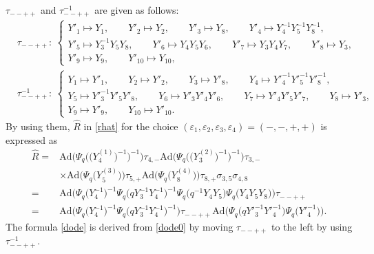 \begin{Example}\label{ex:1}
$\tau_{--++}$ and $\tau_{--++}^{-1}$ are given as follows:
\begin{align*}
&\tau_{--++}\colon\
\begin{cases}
Y'_1 \mapsto Y_1,\qquad
Y'_2 \mapsto Y_2, \qquad
Y'_3 \mapsto Y_8, \qquad
Y'_4 \mapsto Y^{-1}_4Y^{-1}_5Y^{-1}_8, \qquad
\\
Y'_5 \mapsto Y^{-1}_3Y_5Y_8, \qquad
Y'_6 \mapsto Y_4 Y_5 Y_6,\qquad
Y'_7 \mapsto Y_3Y_4Y_7,\qquad
Y'_8 \mapsto Y_3,\qquad
\\
Y'_9 \mapsto Y_9, \qquad
Y'_{10} \mapsto Y_{10},
\end{cases}
\\
&\tau_{--++}^{-1}\colon\
\begin{cases}
Y_1 \mapsto Y'_1, \qquad
Y_2 \mapsto Y'_2, \qquad
Y_3 \mapsto Y'_8, \qquad
Y_4 \mapsto Y'^{-1}_4Y'^{-1}_5Y'^{-1}_8,
\\
Y_5 \mapsto Y'^{-1}_3Y'_5Y'_8, \qquad
Y_6 \mapsto Y'_3Y'_4Y'_6, \qquad
Y_7 \mapsto Y'_4Y'_5Y'_7, \qquad
Y_8 \mapsto Y'_3,
\\
Y_9 \mapsto Y'_9, \qquad
Y_{10} \mapsto Y'_{10}.
\end{cases}
\end{align*}
By using them, $\widehat{R}$ in \eqref{rhat} for the choice
$(\varepsilon_1, \varepsilon_2, \varepsilon_3, \varepsilon_4)=(-,-,+,+)$
is expressed as
\begin{align}
\widehat{R}={}&
\mathrm{Ad}\bigl(\Psi_q\bigl(\bigl(Y^{(1)}_4\bigr)^{-1}\bigr)^{-1}\bigr)\tau_{4,-}
\mathrm{Ad}\bigl(\Psi_q\bigl(\bigl(Y^{(2)}_3\bigr)^{-1}\bigr)^{-1}\bigr)\tau_{3,-}
\nonumber \\
& \times
\mathrm{Ad}\bigl(\Psi_q\bigl(Y^{(3)}_5\bigr)\bigr)\tau_{5,+}
 \mathrm{Ad}\bigl(\Psi_q\bigl(Y^{(4)}_8\bigr)\bigr)\tau_{8,+}\sigma_{3,5}\sigma_{4,8}
\nonumber \\
={}&
\mathrm{Ad}\bigl(\Psi_q\bigl(Y_4^{-1}\bigr)^{-1}
\Psi_q\bigl(qY^{-1}_3Y^{-1}_4\bigr)^{-1}
\Psi_q\bigl(q^{-1}Y_4Y_5\bigr)
\Psi_q\bigl(Y_4Y_5Y_8\bigr)\bigr)\tau_{--++}
\label{dode0}\\
={}&
\mathrm{Ad}\bigl(
\Psi_q\bigl(Y_4^{-1}\bigr)^{-1}
\Psi_q\bigl(qY^{-1}_3Y^{-1}_4\bigr)^{-1}\bigr)
\tau_{--++}
\mathrm{Ad}\bigl(
\Psi_q\bigl(qY'^{-1}_3Y'^{-1}_4\bigr)
\Psi_q\bigl(Y'^{-1}_4\bigr)\bigr).
\label{dode}
\end{align}
The formula \eqref{dode} is derived from \eqref{dode0}
by moving $\tau_{--++}$ to the left by using $\tau_{--++}^{-1}$.
\end{Example}

